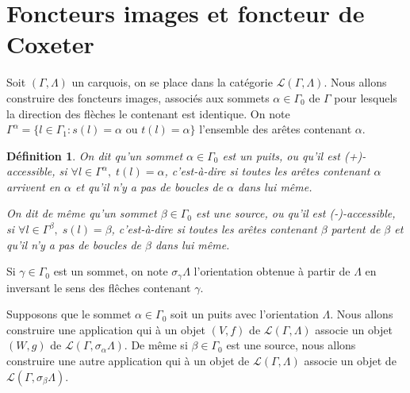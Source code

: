 \documentclass[a4paper,10pt]{article}
\newtheorem{defi}{Définition}[section]
\begin{document}
\clearpage
\section{Foncteurs images et foncteur de Coxeter}
Soit $(\Gamma,\Lambda)$ un carquois, on se place dans la catégorie $\mathscr{L}(\Gamma,\Lambda)$. Nous allons construire des foncteurs images, associés aux sommets $\alpha \in \Gamma_{0}$ de $\Gamma$ pour lesquels la direction des flèches le contenant est identique. On note $\Gamma^{\alpha}=\{ l\in \Gamma_{1} : s(l)=\alpha\text{ ou }t(l)=\alpha\}$ l'ensemble des arêtes contenant $\alpha$.

\begin{defi}
	On dit qu'un sommet $\alpha \in \Gamma_{0}$ est un puits, ou qu'il est (+)-accessible, si $\forall l \in \Gamma^{\alpha},\; t(l)=\alpha$, c'est-à-dire si toutes les arêtes contenant $\alpha$ arrivent en $\alpha$ et qu'il n'y a pas de boucles de $\alpha$ dans lui même.

On dit de même qu'un sommet $\beta \in \Gamma_{0}$ est une source, ou qu'il est (-)-accessible, si $\forall l \in \Gamma^{\beta},\; s(l)=\beta$, c'est-à-dire si toutes les arêtes contenant $\beta$ partent de $\beta$ et qu'il n'y a pas de boucles de $\beta$ dans lui même.
\end{defi}


Si $\gamma \in \Gamma_0$ est un sommet, on note $\sigma_{\gamma}\Lambda$ l'orientation obtenue à partir de $\Lambda$ en inversant le sens des flêches contenant $\gamma$.

Supposons que le sommet $\alpha \in \Gamma_{0}$ soit un puits avec l'orientation $\Lambda$.  Nous allons construire une application qui à un objet $(V,f)$ de $\mathscr{L}(\Gamma,\Lambda)$ associe un objet $(W,g)$ de $\mathscr{L}(\Gamma,\sigma_{\alpha}\Lambda)$. De même si $\beta \in \Gamma_0$ est une source, nous allons construire une autre application qui à un objet de $\mathscr L(\Gamma,\Lambda)$ associe un objet de $\mathscr L(\Gamma,\sigma_{\beta}\Lambda)$. 
\end{document}
